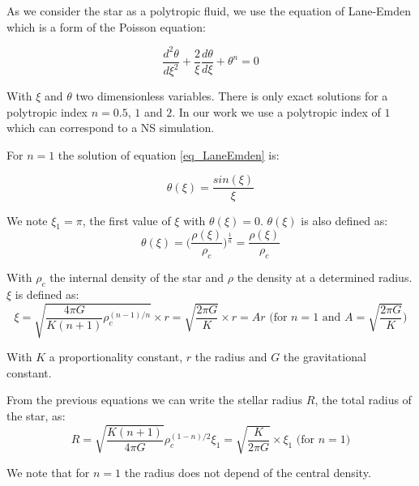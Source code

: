 As we consider the star as a polytropic fluid, we use the equation of Lane-Emden which is a form of the Poisson equation: 

\begin{equation}\label{eq_LaneEmden}
  \frac{d^2\theta}{d \xi^2}+ \frac{2}{\xi}\frac{d\theta}{d\xi}+\theta^n = 0
\end{equation}

With $\xi$ and $\theta$ two dimensionless variables. 
There is only exact solutions for a polytropic index $n = 0.5$, $1$ and $2$.
In our work we use a polytropic index of $1$ which can correspond to a NS simulation.

For $n=1$ the solution of equation \ref{eq_LaneEmden} is: 

\begin{equation}
\theta(\xi)=\frac{sin(\xi)}{\xi}
\end{equation}

We note $\xi_1 = \pi$, the first value of $\xi$ with $\theta(\xi) = 0$.
$\theta(\xi)$ is also defined as: 
\begin{equation}
 \theta(\xi) = \Big(\frac{\rho(\xi)}{\rho_c}\Big)^{\frac{1}{n}}  = \frac{\rho(\xi)}{\rho_c}
\end{equation}

With $\rho_c$ the internal density of the star and $\rho$ the density at a determined radius. $\xi$ is defined as:  
$$ \xi = \sqrt{\frac{4\pi G}{K(n+1)}\rho_c^{(n-1)/n}} \times r = \sqrt{\frac{2\pi G}{K}}\times r = Ar\mbox{ (for } n=1 \mbox{ and } A=\sqrt{\frac{2\pi G}{K}} \mbox{)}$$

With $K$ a proportionality constant, $r$ the radius and $G$ the gravitational constant.

From the previous equations we can write the stellar radius $R$, the total radius of the star, as:
\begin{equation}
R = \sqrt{\frac{K(n+1)}{4\pi G}}\rho_c^{(1-n)/2}\xi_1 = \sqrt{ \frac{K}{2\pi G} } \times \xi_1 \mbox{ (for } n=1 \mbox{)}
\end{equation} 

We note that for $n=1$ the radius does not depend of the central density.

